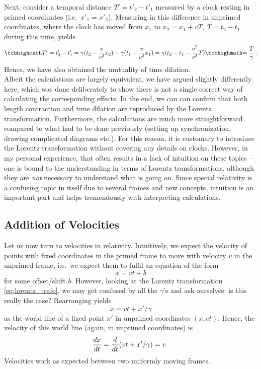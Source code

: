 Next, consider a temporal distance $T' = t'_2 - t'_1$ measured by a clock resting in primed coordinates (i.e.~$x'_1 = x'_2$). Measuring in this difference in unprimed coordinates, where the clock has moved from $x_1$ to $x_2 = x_1 + v T, \; T = t_2 - t_1$ during this time, yields
\begin{equation}
	\eqbox{T'} = t'_2 - t'_1 = \gamma (t_2 - \frac{v}{c^2} x_2) - \gamma (t_1 - \frac{v}{c^2} x_1) = \gamma (t_2 - t_1 - \frac{v^2}{c^2} T) \eqbox{= \frac{T}{\gamma}} \, .
\end{equation}
Hence, we have also obtained the mutuality of time dilation.\\


Albeit the calculations are largely equivalent, we have argued slightly differently here, which was done deliberately to show there is not a single correct way of calculating the corresponding effects. In the end, we can can confirm that both length contraction and time dilation are reproduced by the Lorentz transformation. Furthermore, the calculations are much more straightforward compared to what had to be done previously (setting up synchronization, drawing complicated diagrams etc.). For this reason, it is customary to introduce the Lorentz transformation without covering any details on clocks. However, in my personal experience, that often results in a lack of intuition on these topics -- one is bound to the understanding in terms of Lorentz transformations, although they are \emph{not} necessary to understand what is going on. Since special relativity is a confusing topic in itself due to several frames and new concepts, intuition is an important part and helps tremendously with interpreting calculations.



		\subsection{Addition of Velocities}
Let us now turn to velocities in relativity. Intuitively, we expect the velocity of points with fixed coordinates in the primed frame to move with velocity $v$ in the unprimed frame, i.e.~we expect them to fulfil an equation of the form
\begin{equation*}
	x = v t + b
\end{equation*}
for some offset/shift $b$. However, looking at the Lorentz transformation \eqref{eq:lorentz_trafo}, we may get confused by all the $\gamma$'s and ask ourselves: is this really the case? Rearranging yields
\begin{equation}
	x = v t + x' / \gamma
\end{equation}
as the world line of a fixed point $x'$ in unprimed coordinates $(x, c t)$. Hence, the velocity of this world line (again, in unprimed coordinates) is
\begin{equation}
	\dv{x}{t} = \dv{t} (v t + x' / \gamma) = v \, .
\end{equation}
Velocities work as expected between two uniformly moving frames.\\



